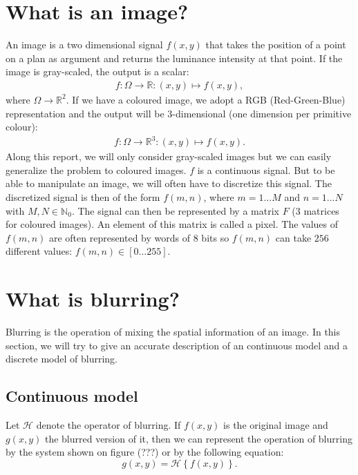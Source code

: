 \label{mathModel}
\section{What is an image?}

An image is a two dimensional signal $f(x,y)$ that takes the position of a point on a plan as argument and returns the luminance intensity at that point. If the image is gray-scaled, the output is a scalar:
\begin{eqnarray}
f:\Omega \rightarrow \mathbb{R}: (x,y) \mapsto f(x,y),
\end{eqnarray}
where $\Omega \rightarrow \mathbb{R}^2$. If we have a coloured image, we adopt a RGB (Red-Green-Blue) representation and the output will be 3-dimensional (one dimension per primitive colour):
\begin{eqnarray}
f:\Omega \rightarrow \mathbb{R}^3 : (x,y) \mapsto f(x,y).
\end{eqnarray}
Along this report, we will only consider gray-scaled images but we can easily generalize the problem to coloured images. $f$ is a continuous signal. But to be able to manipulate an image, we will often have to discretize this signal. The discretized signal is then of the form $f(m,n)$, where $m=1...M$ and $n=1...N$ with $M,N \in \mathbb{N}_0$. The signal can then be represented by a matrix $F$ (3 matrices for coloured images). An element  of this matrix is called a pixel. The values of $f(m,n)$ are often represented by words of $8$ bits so $f(m,n)$ can take $256$ different values: $f(m,n) \in \left[0...255\right]$.

\section{What is blurring?}

Blurring is the operation of mixing the spatial information of an image. In this section, we will try to give an accurate description of an continuous model and a discrete model of blurring.

\subsection{Continuous model}

Let $\mathcal{H}$ denote the operator of blurring. If $f(x,y)$ is the original image and $g(x,y)$ the blurred version of it, then we can represent the operation of blurring by the system shown on figure (???) or by the following equation:
\begin{equation}
g(x,y) = \mathcal{H}\left\lbrace f(x,y) \right\rbrace.
\end{equation}

